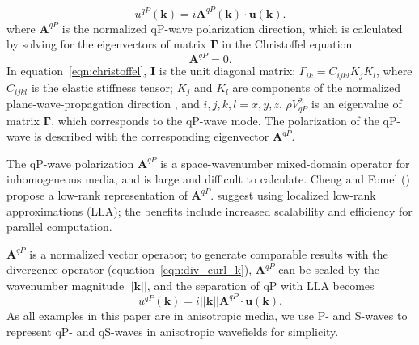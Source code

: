 \documentclass[manuscript,ulem,graphix,revised]{geophysics}
\begin{document}
\begin{equation}
u^{qP}(\boldsymbol{k})=i \boldsymbol{A}^{qP}(\boldsymbol{k}) \cdot \boldsymbol{u}(\boldsymbol{k}).
\label{eqn:div_curl_ak}
\end{equation}
where $\boldsymbol{A}^{qP}$ is the normalized qP-wave polarization direction, which is calculated by solving for the eigenvectors of matrix $\boldsymbol{\Gamma}$ in the Christoffel equation
\begin{equation}
[\boldsymbol{\Gamma}-\rho V_{qP}^2\boldsymbol{I}]\boldsymbol{A}^{qP}=0.
\label{eqn:christoffel}
\end{equation}
In equation~\ref{eqn:christoffel}, $\boldsymbol{I}$ is the unit diagonal matrix; $\Gamma_{ik}=C_{ijkl}K_jK_l$, where $C_{ijkl}$ is the elastic stiffness tensor; $K_j$ and $K_l$ are components of the normalized plane-wave-propagation direction \citep{zhang10}, and $i,j,k,l = x,y,z$. $\rho V_{qP}^2$ is an eigenvalue of matrix $\boldsymbol{\Gamma}$, which corresponds to the qP-wave mode. The polarization of the qP-wave is described with the corresponding eigenvector $\boldsymbol{A}^{qP}$. 

The qP-wave polarization $\boldsymbol{A}^{qP}$ is a space-wavenumber mixed-domain operator for\marginnote{[16]} inhomogeneous media, and is large and difficult to calculate. Cheng and Fomel (\citeyear{cheng14}) propose a low-rank representation of $\boldsymbol{A}^{qP}$.
\citet{wenlong17} suggest using localized low-rank approximations (LLA); the benefits include increased scalability and efficiency for parallel computation.  

\marginnote{[17]}$\boldsymbol{A}^{qP}$ is a normalized vector operator; to generate comparable results with the divergence operator (equation~\ref{eqn:div_curl_k}), $\boldsymbol{A}^{qP}$ can be scaled by the wavenumber magnitude $||\boldsymbol{k}||$, and the separation of qP with LLA becomes \marginnote{[18,20]}
\begin{equation}
u^{qP}(\boldsymbol{k})=i||\boldsymbol{k}||\boldsymbol{A}^{qP} \cdot \boldsymbol{u}(\boldsymbol{k}).
\label{eqn:div_curl_ak1}
\end{equation}
As all examples in this paper are in anisotropic media, we use P- and S-waves to represent qP- and qS-waves in anisotropic wavefields for simplicity.
\end{document}

